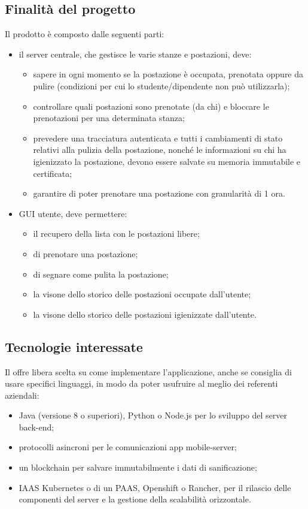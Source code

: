 \subsection{Finalità del progetto}
Il prodotto è composto dalle seguenti parti:
\begin{itemize}
\item il server centrale, che gestisce le varie stanze e postazioni, deve:
\begin{itemize}
\item sapere in ogni momento se la postazione è occupata, prenotata oppure da pulire (condizioni per cui
lo studente/dipendente non può utilizzarla);
\item controllare quali postazioni sono prenotate (da chi) e bloccare le prenotazioni per una determinata stanza;
\item prevedere una tracciatura autenticata e tutti i cambiamenti di stato relativi alla pulizia della
postazione, nonché le informazioni su chi ha igienizzato la postazione, devono essere salvate su
memoria immutabile e certificata;
\item garantire di poter prenotare una postazione con granularità di 1 ora.
\end{itemize}
\item GUI utente, deve permettere:
\begin{itemize}
\item il recupero della lista con le postazioni libere;
\item di prenotare una postazione;
\item di segnare come pulita la postazione;
\item la visone dello storico delle postazioni occupate dall'utente;
\item la visone dello storico delle postazioni igienizzate dall'utente.
\end{itemize}
\end{itemize}

\subsection{Tecnologie interessate}
Il  offre libera scelta su come implementare l'applicazione, anche se consiglia di usare specifici linguaggi, in modo da poter usufruire al meglio dei referenti aziendali:
\begin{itemize}
\item Java (versione 8 o superiori), Python o Node.js per lo sviluppo del server back-end;
\item protocolli asincroni per le comunicazioni app mobile-server;
\item un  blockchain per salvare immutabilmente i dati di sanificazione;
\item IAAS Kubernetes o di un PAAS, Openshift o Rancher, per il rilascio delle componenti del server e la
gestione della scalabilità orizzontale.
\end{itemize}

